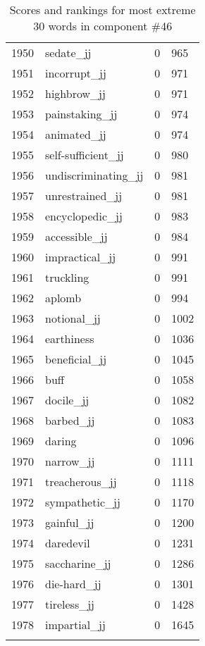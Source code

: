 \begin{longtable}[!htbp]{| rlr@{.}l |}
    1950 & sedate\_jj & 0 & 965 \\
    1951 & incorrupt\_jj & 0 & 971 \\
    1952 & highbrow\_jj & 0 & 971 \\
    1953 & painstaking\_jj & 0 & 974 \\
    1954 & animated\_jj & 0 & 974 \\
    1955 & self-sufficient\_jj & 0 & 980 \\
    1956 & undiscriminating\_jj & 0 & 981 \\
    1957 & unrestrained\_jj & 0 & 981 \\
    1958 & encyclopedic\_jj & 0 & 983 \\
    1959 & accessible\_jj & 0 & 984 \\
    1960 & impractical\_jj & 0 & 991 \\
    1961 & truckling & 0 & 991 \\
    1962 & aplomb & 0 & 994 \\
    1963 & notional\_jj & 0 & 1002 \\
    1964 & earthiness & 0 & 1036 \\
    1965 & beneficial\_jj & 0 & 1045 \\
    1966 & buff & 0 & 1058 \\
    1967 & docile\_jj & 0 & 1082 \\
    1968 & barbed\_jj & 0 & 1083 \\
    1969 & daring & 0 & 1096 \\
    1970 & narrow\_jj & 0 & 1111 \\
    1971 & treacherous\_jj & 0 & 1118 \\
    1972 & sympathetic\_jj & 0 & 1170 \\
    1973 & gainful\_jj & 0 & 1200 \\
    1974 & daredevil & 0 & 1231 \\
    1975 & saccharine\_jj & 0 & 1286 \\
    1976 & die-hard\_jj & 0 & 1301 \\
    1977 & tireless\_jj & 0 & 1428 \\
    1978 & impartial\_jj & 0 & 1645 \\
    \hline
    \caption{Scores and rankings for most extreme 30 words in component \#46} \\
\end{longtable}
